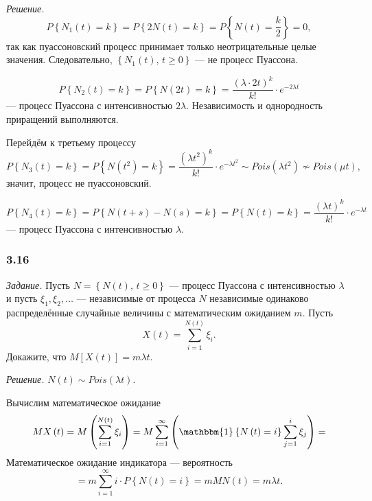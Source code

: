 \textit{Решение.}
$$P \left\{ N_1 \left( t \right) = k \right\} =
  P \left\{ 2N \left( t \right) = k \right\} =
  P \left\{ N \left( t \right) = \frac{k}{2} \right\} =
  0,$$
так как пуассоновский процесс принимает только неотрицательные целые значения.
Следовательно, $ \left\{ N_1 \left( t \right), \, t \geq 0 \right\} $ --- не процесс Пуассона.

$$P \left\{ N_2 \left( t \right) = k \right\} =
  P \left\{ N \left( 2t \right) = k \right\} =
  \frac{ \left( \lambda \cdot 2t \right)^k}{k!} \cdot e^{-2 \lambda t}$$
--- процесс Пуассона с интенсивностью $2 \lambda $.
Независимость и однородность приращений выполняются.


Перейдём к третьему процессу
$$P \left\{ N_3 \left( t \right) = k \right\} =
  P \left\{ N \left( t^2 \right) = k \right\} =
  \frac{ \left( \lambda t^2 \right)^k}{k!} \cdot e^{-\lambda t^2} \sim
  Pois \left( \lambda t^2 \right) \not \sim
  Pois \left( \mu t \right),$$
значит, процесс не пуассоновский.

$$P \left\{ N_4 \left( t \right) = k \right\} =
  P \left\{ N \left( t + s \right) - N \left( s \right) = k \right\} =
  P \left\{ N \left( t \right) = k \right\} =
  \frac{ \left( \lambda t \right)^k}{k!} \cdot e^{-\lambda t}$$
--- процесс Пуассона с интенсивностью $ \lambda $.

\subsubsection*{3.16}

\textit{Задание.}
Пусть $N = \left\{ N \left( t \right), \, t \geq 0 \right\} $ ---
процесс Пуассона с интенсивностью $ \lambda $ и пусть $ \xi_1, \xi_2, \dotsc $ ---
независимые от процесса $N$
независимые одинаково распределённые случайные величины с математическим ожиданием $m$.
Пусть
$$X \left( t \right) =
  \sum \limits_{i = 1}^{N \left( t \right) } \xi_i.$$
Докажите, что $M \left[ X \left( t \right) \right] = m \lambda t$.

\textit{Решение.}
$N \left( t \right) \sim Pois \left( \lambda t \right) $.

Вычислим математическое ожидание
$$MX \left( t \right) =
  M \left( \sum \limits_{i = 1}^{N \left( t \right) } \xi_i \right) =
  M \sum \limits_{i = 1}^{ \infty } \left(
    \mathbbm{1} \left\{ N \left( t \right) = i \right\} \sum \limits_{j = 1}^i \xi_j \right) =$$
Математическое ожидание индикатора --- вероятность
$$= m \sum \limits_{i = 1}^{ \infty } i \cdot P \left\{ N \left( t \right) = i \right\} =
  mMN \left( t \right) =
  m \lambda t.$$

